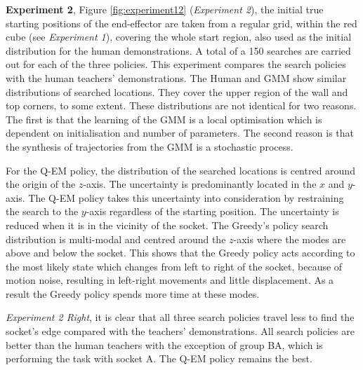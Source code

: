 \documentclass[final,5p,times,twocolumn]{elsarticle}
\begin{document}
\textbf{Experiment 2}, Figure \ref{fig:experiment12} (\textit{Experiment 2}), the initial true starting positions 
of the end-effector are taken from a regular grid, within the red cube (see \textit{Experiment 1}), covering the whole start region, also used as the initial distribution for 
the human demonstrations. A total of a 150 searches are carried out for each of the three policies. 
This experiment compares the search policies with the human teachers' demonstrations. 
The Human and GMM show similar distributions of searched locations. They cover the upper region of the wall and top corners, to some extent. These distributions 
are not identical for two reasons. The first is that the learning of the GMM is a local optimisation 
which is dependent on initialisation and number of parameters. The second reason is that the synthesis of trajectories 
from the GMM is a stochastic process. 

For the  Q-EM policy, the distribution of the searched locations is centred around the origin of the $z$-axis.
The uncertainty is predominantly located in the $x$ and $y$-axis. The Q-EM policy takes this uncertainty 
into consideration by restraining the search to the $y$-axis regardless of the starting position. The uncertainty 
is reduced when it is in the vicinity of the socket. The Greedy's policy search distribution is multi-modal and 
centred around the $z$-axis where the modes are above and below the socket. This shows that the Greedy policy 
acts according to the most likely state which changes from left to right of the socket, because of motion noise, 
resulting in left-right movements and little displacement. As a result the Greedy policy spends more time at these modes.

\textit{Experiment 2 Right}, it is clear that all three search policies travel less to find the socket's edge compared 
with the teachers' demonstrations. All search policies are better than the human teachers with the exception of group BA, 
which is performing the task with socket A. The Q-EM policy remains the best. 
\end{document}
